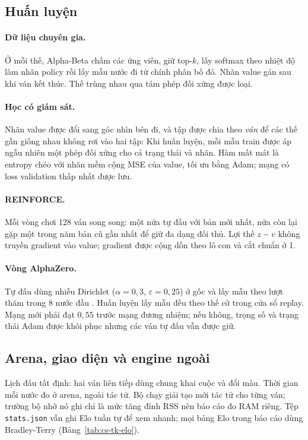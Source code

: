 \subsection{Huấn luyện}
\paragraph{Dữ liệu chuyên gia.} Ở mỗi thế, Alpha-Beta chấm các ứng viên, giữ top-$k$, lấy softmax theo nhiệt độ làm
nhãn policy rồi lấy mẫu nước đi từ chính phân bố đó. Nhãn value gán sau khi ván kết thúc. Thế trùng nhau qua tám phép
đối xứng được loại.

\paragraph{Học có giám sát.} Nhãn value được đổi sang góc nhìn bên đi, và tập được chia theo \emph{ván} để các thế gần
giống nhau không rơi vào hai tập:
Khi huấn luyện, mỗi mẫu train được áp ngẫu nhiên một phép đối xứng cho cả trạng thái và nhãn. Hàm mất mát là entropy
chéo với nhãn mềm cộng MSE của value, tối ưu bằng Adam; mạng có loss validation thấp nhất được lưu.

\paragraph{REINFORCE.} Mỗi vòng chơi 128 ván song song: một nửa tự đấu với bản mới nhất, nửa còn lại gặp một trong năm
bản cũ gần nhất để giữ đa dạng đối thủ. Lợi thế $z-v$ không truyền gradient vào value; gradient được cộng dồn theo lô
con và cắt chuẩn ở 1.

\paragraph{Vòng AlphaZero.} Tự đấu dùng nhiễu Dirichlet ($\alpha=0{,}3$, $\varepsilon=0{,}25$) ở gốc và lấy mẫu theo lượt
thăm trong 8 nước đầu \cite{silver2018alphazero}. Huấn luyện lấy mẫu đều theo thế cờ trong cửa sổ replay. Mạng mới phải
đạt $0{,}55$ trước mạng đương nhiệm; nếu không, trọng số và trạng thái Adam được khôi phục nhưng các ván tự đấu vẫn
được giữ.

\subsection{Arena, giao diện và engine ngoài}
Lịch đấu tất định: hai ván liên tiếp dùng chung khai cuộc và đổi màu. Thời gian mỗi nước đo ở arena, ngoài tác tử. Bộ
chạy giải tạo mới tác tử cho từng ván; trường bộ nhớ nó ghi chỉ là mức tăng đỉnh RSS nên báo cáo đo RAM riêng. Tệp
\texttt{stats.json} vẫn ghi Elo tuần tự để xem nhanh; mọi bảng Elo trong báo cáo dùng Bradley-Terry
(Bảng~\ref{tab:cs-tk-elo}).

